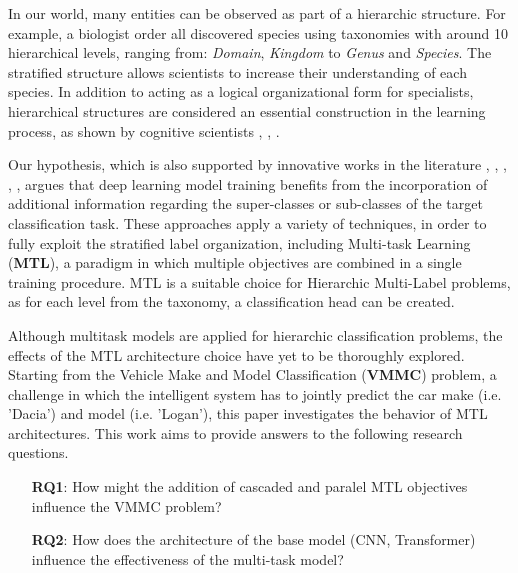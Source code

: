 \documentclass[conference]{IEEEtran}
\begin{document}
In our world, many entities can be observed as part of a hierarchic structure. For example, a biologist order all discovered species using taxonomies with around 10 hierarchical levels, ranging from: \textit{Domain}, \textit{Kingdom} to \textit{Genus} and \textit{Species}. The stratified structure allows scientists to increase their understanding of each species. In addition to acting as a logical organizational form for specialists, hierarchical structures are considered an essential construction in the learning process, as shown by cognitive scientists \cite{botvinick2009hierarchically}, \cite{eckstein2021mind}, \cite{theves2021learning}. 



Our hypothesis, which is also supported by innovative works in the literature \cite{chen2019deep}, \cite{pujari2021multi}, \cite{wang2021label},  \cite{wang2023consistency}, \cite{jiang2024hierarchical}, argues that deep learning model training benefits from the incorporation of additional information regarding the super-classes or sub-classes of the target classification task. These approaches apply a variety of techniques, in order to fully exploit the stratified label organization, including Multi-task Learning (\textbf{MTL}), a paradigm in which multiple objectives are combined in a single training procedure. MTL is a suitable choice for Hierarchic Multi-Label problems, as for each level from the taxonomy, a classification head can be created. 

Although multitask models are applied for hierarchic classification problems, the effects of the MTL architecture choice have yet to be thoroughly explored. Starting from the Vehicle Make and Model Classification (\textbf{VMMC}) problem, a challenge in which the intelligent system has to jointly predict the car make (i.e. 'Dacia') and model (i.e. 'Logan'), this paper investigates the behavior of MTL architectures. This work aims to provide answers to the following research questions. 

\begin{enumerate}
    \item[\textbf{RQ1}:] 
    How might the addition of cascaded and paralel MTL objectives influence the VMMC problem?
    \item[\textbf{RQ2}:] 
    How does the architecture of the base model (CNN, Transformer) influence the effectiveness of the multi-task model?
\end{enumerate}
\end{document}
